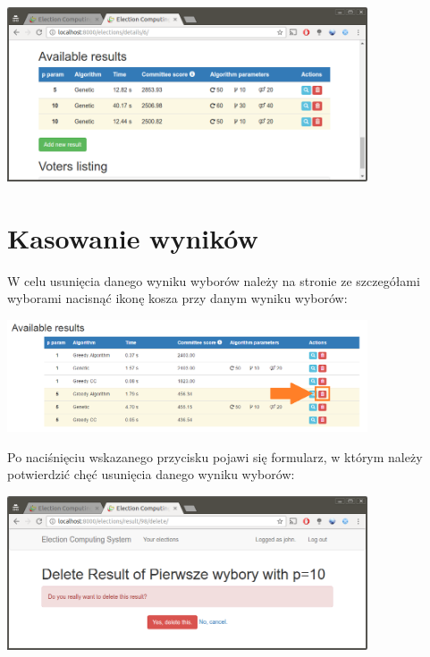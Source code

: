 \documentclass[pdflatex,11pt]{../aghdoc_version2}
\begin{document}
\begin{center}
\includegraphics[width=0.8\textwidth]{pics/results-on-table.png}
\end{center}

\section{Kasowanie wyników}
\label{sec:kasowaniewynikow}
W celu usunięcia danego wyniku wyborów należy na stronie ze szczegółami wyborami nacisnąć ikonę kosza przy danym wyniku wyborów: \\

\begin{center}
\includegraphics[width=0.8\textwidth]{pics/delete_result_button.png}
\end{center}

\newpage
Po naciśnięciu wskazanego przycisku pojawi się formularz, w którym należy potwierdzić chęć usunięcia danego wyniku wyborów: \\

\begin{center}
\includegraphics[width=0.8\textwidth]{pics/delete-result.png}
\end{center}
\end{document}
